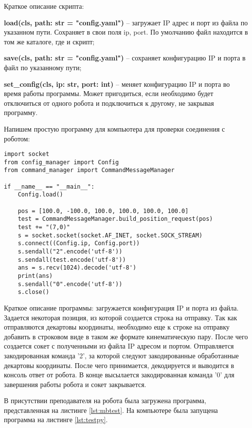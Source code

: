 \documentclass[a4paper,14pt]{extarticle}
\begin{document}
Краткое описание скрипта:
\begin{compactitem}
    \item \textbf{load(cls, path: str = "config.yaml")} -- загружает
    IP адрес и порт из файла по указанном пути. Сохраняет в свои поля ip, port.
    По умолчанию файл находится в том же каталоге, где и скрипт;
    \item \textbf{save(cls, path: str = "config.yaml")} -- сохраняет
    конфигурацию IP и порта в файл по указанному пути;
    \item \textbf{set\_config(cls, ip: str, port: int)} -- меняет
    конфигурацию IP и порта во время работы программы. Может пригодиться,
    если необходимо будет отключиться от одного робота и подключиться к другому,
    не закрывая программу.
\end{compactitem}


Напишем простую программу для компьютера для проверки соединения
с роботом:
\begin{lstlisting}[label=lst:testpy, caption={Простая программа на клиенте для проверки соединения с роботом.}]
import socket
from config_manager import Config
from command_manager import CommandMessageManager

if __name__ == "__main__":
    Config.load()

    pos = [100.0, -100.0, 100.0, 100.0, 100.0, 100.0]
    test = CommandMessageManager.build_position_request(pos)
    test += "(7,0)"
    s = socket.socket(socket.AF_INET, socket.SOCK_STREAM)
    s.connect((Config.ip, Config.port))
    s.sendall("2".encode('utf-8'))
    s.sendall(test.encode('utf-8'))
    ans = s.recv(1024).decode('utf-8')
    print(ans)
    s.sendall("0".encode('utf-8'))
    s.close()
\end{lstlisting}


Краткое описание программы: загружается конфигурация IP и порта
из файла. Задается некоторая позиция, из которой создается строка
на отправку. Так как отправляются декартовы координаты, необходимо
еще к строке на отправку добавить в строковом виде в таком же
формате кинематическую пару. После чего создается сокет
с полученными из файла IP адресом и портом. Отправляется закодированная команда '2',
за которой следуют закодированные обработанные декартовы координаты.
После чего принимается, декодируется и выводится в консоль ответ от робота.
В конце высылается закодированная команда '0' для завершения работы робота
и сокет закрывается.


В присутствии преподавателя на робота была загружена программа,
представленная на листинге \ref{lst:mbtest}. На компьютере
была запущена программа на листинге \ref{lst:testpy}.
\end{document}
